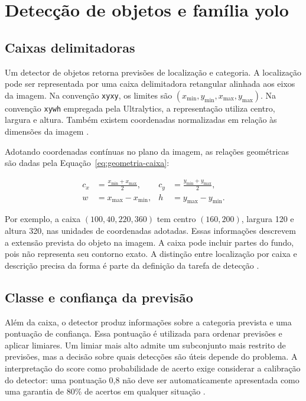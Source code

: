 \section{Detecção de objetos e família \texorpdfstring{\acrshort{yolo}}{YOLO}}
\label{sec:deteccao-yolo}

\subsection{Caixas delimitadoras}
\label{subsec:caixas-delimitadoras}

Um detector de objetos retorna previsões de localização e categoria. A localização pode ser representada por uma caixa delimitadora retangular alinhada aos eixos da imagem. Na convenção \texttt{xyxy}, os limites são \((x_{\min},y_{\min},x_{\max},y_{\max})\). Na convenção \texttt{xywh} empregada pela Ultralytics, a representação utiliza centro, largura e altura. Também existem coordenadas normalizadas em relação às dimensões da imagem \cite{ultralytics-detect}.

Adotando coordenadas contínuas no plano da imagem, as relações geométricas são dadas pela Equação~\ref{eq:geometria-caixa}:

\begin{equation}
    \label{eq:geometria-caixa}
    \begin{aligned}
        c_x &= \frac{x_{\min}+x_{\max}}{2}, &
        c_y &= \frac{y_{\min}+y_{\max}}{2}, \\
        w &= x_{\max}-x_{\min}, &
        h &= y_{\max}-y_{\min}.
    \end{aligned}
\end{equation}

Por exemplo, a caixa \((100,40,220,360)\) tem centro \((160,200)\), largura 120 e altura 320, nas unidades de coordenadas adotadas. Essas informações descrevem a extensão prevista do objeto na imagem. A caixa pode incluir partes do fundo, pois não representa seu contorno exato. A distinção entre localização por caixa e descrição precisa da forma é parte da definição da tarefa de detecção \cite{ultralytics-detect}.

\subsection{Classe e confiança da previsão}
\label{subsec:classe-confianca}

Além da caixa, o detector produz informações sobre a categoria prevista e uma pontuação de confiança. Essa pontuação é utilizada para ordenar previsões e aplicar limiares. Um limiar mais alto admite um subconjunto mais restrito de previsões, mas a decisão sobre quais detecções são úteis depende do problema. A interpretação do score como probabilidade de acerto exige considerar a calibração do detector: uma pontuação 0,8 não deve ser automaticamente apresentada como uma garantia de 80\% de acertos em qualquer situação \cite{kuppers}.

